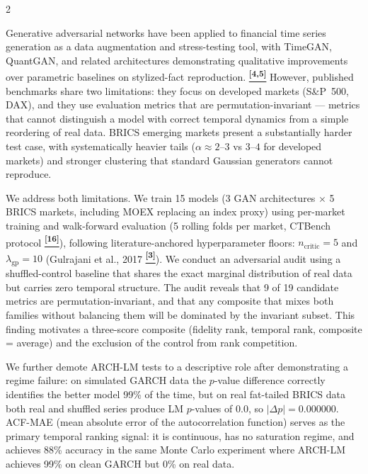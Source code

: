 \documentclass[10pt]{article}
\newcommand{\tcite}[1]{%
  \hyperlink{R:#1}{\textsuperscript{\scriptsize\textbf{[#1]}}}}
\begin{document}
\begin{multicols}{2}

\small
Generative adversarial networks have been applied to financial time series generation as a data augmentation and stress-testing tool, with TimeGAN, QuantGAN, and related architectures demonstrating qualitative improvements over parametric baselines on stylized-fact reproduction.\tcite{4,5} However, published benchmarks share two limitations: they focus on developed markets (S\&P~500, DAX), and they use evaluation metrics that are permutation-invariant --- metrics that cannot distinguish a model with correct temporal dynamics from a simple reordering of real data. BRICS emerging markets present a substantially harder test case, with systematically heavier tails ($\alpha \approx 2$--$3$ vs $3$--$4$ for developed markets) and stronger clustering that standard Gaussian generators cannot reproduce.

We address both limitations. We train 15 models (3 GAN architectures $\times$ 5 BRICS markets, including MOEX replacing an index proxy) using per-market training and walk-forward evaluation (5 rolling folds per market, CTBench protocol\tcite{16}), following literature-anchored hyperparameter floors: $n_\text{critic}=5$ and $\lambda_\text{gp}=10$ (Gulrajani et al., 2017\tcite{3}). We conduct an adversarial audit using a shuffled-control baseline that shares the exact marginal distribution of real data but carries zero temporal structure. The audit reveals that 9 of 19 candidate metrics are permutation-invariant, and that any composite that mixes both families without balancing them will be dominated by the invariant subset. This finding motivates a three-score composite (fidelity rank, temporal rank, composite = average) and the exclusion of the control from rank competition.

We further demote ARCH-LM tests to a descriptive role after demonstrating a regime failure: on simulated GARCH data the $p$-value difference correctly identifies the better model 99\% of the time, but on real fat-tailed BRICS data both real and shuffled series produce LM $p$-values of 0.0, so $|\Delta p| = 0.000000$. ACF-MAE (mean absolute error of the autocorrelation function) serves as the primary temporal ranking signal: it is continuous, has no saturation regime, and achieves 88\% accuracy in the same Monte Carlo experiment where ARCH-LM achieves 99\% on clean GARCH but 0\% on real data.


\end{multicols}
\end{document}
